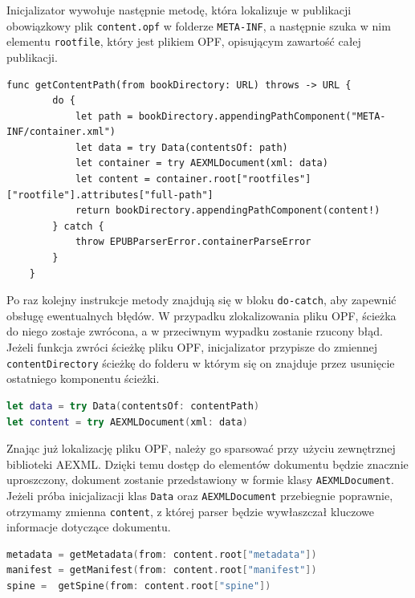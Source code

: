 Inicjalizator wywołuje następnie metodę, która lokalizuje w publikacji obowiązkowy plik \texttt{content.opf} w folderze \texttt{META-INF}, a następnie szuka w nim elementu \texttt{rootfile}, który jest plikiem OPF, opisującym zawartość całej publikacji.

\begin{lstlisting}[caption={Implementacja metody getContentPath(from bookDirectory:)},language=swift-reference]
    func getContentPath(from bookDirectory: URL) throws -> URL {
        do {
            let path = bookDirectory.appendingPathComponent("META-INF/container.xml")
            let data = try Data(contentsOf: path)
            let container = try AEXMLDocument(xml: data)
            let content = container.root["rootfiles"]["rootfile"].attributes["full-path"]
            return bookDirectory.appendingPathComponent(content!)
        } catch {
            throw EPUBParserError.containerParseError
        }
    }
\end{lstlisting}

Po raz kolejny instrukcje metody znajdują się w bloku \texttt{do-catch}, aby zapewnić obsługę ewentualnych błędów. W przypadku zlokalizowania pliku OPF, ścieżka do niego zostaje zwrócona, a w przeciwnym wypadku zostanie rzucony błąd. Jeżeli funkcja zwróci ścieżkę pliku OPF, inicjalizator przypisze do zmiennej \texttt{contentDirectory} ścieżkę do folderu w którym się on znajduje przez usunięcie ostatniego komponentu ścieżki.

\begin{lstlisting}[firstnumber=14, language=swift,caption=aaa,label=cccc]
let data = try Data(contentsOf: contentPath)
let content = try AEXMLDocument(xml: data)
\end{lstlisting}

Znając już lokalizację pliku OPF, należy go sparsować przy użyciu zewnętrznej biblioteki AEXML. Dzięki temu dostęp do elementów dokumentu będzie znacznie uproszczony, dokument zostanie przedstawiony w formie klasy \texttt{AEXMLDocument}. Jeżeli próba inicjalizacji klas \texttt{Data} oraz \texttt{AEXMLDocument} przebiegnie poprawnie, otrzymamy zmienna \texttt{content}, z której parser będzie wywłaszczał kluczowe informacje dotyczące dokumentu.

\begin{lstlisting}[firstnumber=16, language=swift,caption=aa=,label=fdffr]
metadata = getMetadata(from: content.root["metadata"])
manifest = getManifest(from: content.root["manifest"])
spine =  getSpine(from: content.root["spine"])
\end{lstlisting}

